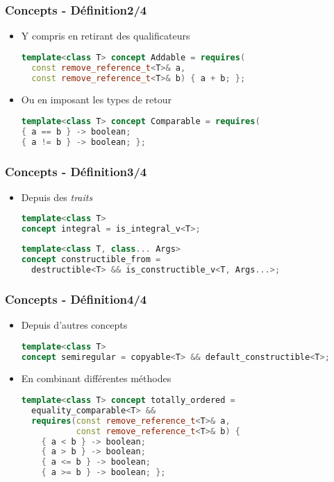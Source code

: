 \documentclass[C++.tex]{subfiles}
\begin{document}
\begin{frame}[fragile]
	\frametitle{Concepts - Définition\titlehfill{}2/4}
	\begin{itemize}
		\item Y compris en retirant des qualificateurs

		\begin{lstlisting}[language=C++]
template<class T> concept Addable = requires(
  const remove_reference_t<T>& a,
  const remove_reference_t<T>& b) { a + b; };\end{lstlisting}

		\item Ou en imposant les types de retour

		\begin{lstlisting}[language=C++]
template<class T> concept Comparable = requires(
{ a == b } -> boolean;
{ a != b } -> boolean; };\end{lstlisting}
	\end{itemize}
\end{frame}

\begin{frame}[fragile]
	\frametitle{Concepts - Définition\titlehfill{}3/4}
	\begin{itemize}
		\item Depuis des \textit{traits}

		\begin{lstlisting}[language=C++]
template<class T>
concept integral = is_integral_v<T>;\end{lstlisting}

		\begin{lstlisting}[language=C++]
template<class T, class... Args>
concept constructible_from = 
  destructible<T> && is_constructible_v<T, Args...>;\end{lstlisting}
	\end{itemize}
\end{frame}

\begin{frame}[fragile]
	\frametitle{Concepts - Définition\titlehfill{}4/4}
	\begin{itemize}
		\item Depuis d'autres concepts

		\begin{lstlisting}[language=C++]
template<class T>
concept semiregular = copyable<T> && default_constructible<T>;\end{lstlisting}

		\item En combinant différentes méthodes

		\begin{lstlisting}[language=C++]
template<class T> concept totally_ordered =
  equality_comparable<T> &&
  requires(const remove_reference_t<T>& a,
           const remove_reference_t<T>& b) {
    { a < b } -> boolean;
    { a > b } -> boolean;
    { a <= b } -> boolean;
    { a >= b } -> boolean; };\end{lstlisting}
	\end{itemize}
\end{frame}
\end{document}
